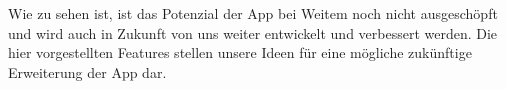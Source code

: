 \documentclass[titlepage, a4paper, 11pt]{scrartcl}
\begin{document}
        Wie zu sehen ist, ist das Potenzial der App bei Weitem noch nicht ausgeschöpft und wird auch in Zukunft von uns weiter entwickelt und verbessert werden. 
        Die hier vorgestellten Features stellen unsere Ideen für eine mögliche zukünftige Erweiterung der App dar.

  
  
\end{document}

